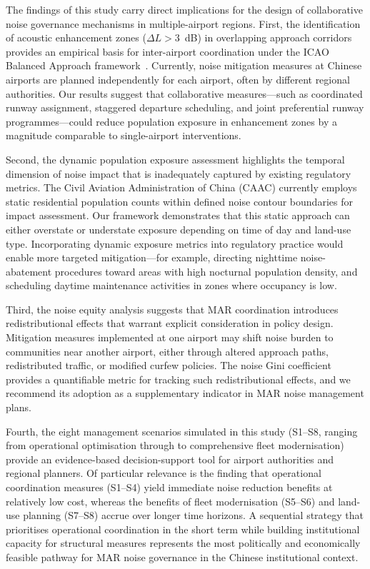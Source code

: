 \documentclass[review,12pt]{elsarticle}
\begin{document}
The findings of this study carry direct implications for the design of collaborative noise governance mechanisms in multiple-airport regions. First, the identification of acoustic enhancement zones ($\Delta L > 3$~dB) in overlapping approach corridors provides an empirical basis for inter-airport coordination under the ICAO Balanced Approach framework~\citep{icao2016balanced}. Currently, noise mitigation measures at Chinese airports are planned independently for each airport, often by different regional authorities. Our results suggest that collaborative measures---such as coordinated runway assignment, staggered departure scheduling, and joint preferential runway programmes---could reduce population exposure in enhancement zones by a magnitude comparable to single-airport interventions.

Second, the dynamic population exposure assessment highlights the temporal dimension of noise impact that is inadequately captured by existing regulatory metrics. The Civil Aviation Administration of China (CAAC) currently employs static residential population counts within defined noise contour boundaries for impact assessment. Our framework demonstrates that this static approach can either overstate or understate exposure depending on time of day and land-use type. Incorporating dynamic exposure metrics into regulatory practice would enable more targeted mitigation---for example, directing nighttime noise-abatement procedures toward areas with high nocturnal population density, and scheduling daytime maintenance activities in zones where occupancy is low.

Third, the noise equity analysis suggests that MAR coordination introduces redistributional effects that warrant explicit consideration in policy design. Mitigation measures implemented at one airport may shift noise burden to communities near another airport, either through altered approach paths, redistributed traffic, or modified curfew policies. The noise Gini coefficient provides a quantifiable metric for tracking such redistributional effects, and we recommend its adoption as a supplementary indicator in MAR noise management plans.

Fourth, the eight management scenarios simulated in this study (S1--S8, ranging from operational optimisation through to comprehensive fleet modernisation) provide an evidence-based decision-support tool for airport authorities and regional planners. Of particular relevance is the finding that operational coordination measures (S1--S4) yield immediate noise reduction benefits at relatively low cost, whereas the benefits of fleet modernisation (S5--S6) and land-use planning (S7--S8) accrue over longer time horizons. A sequential strategy that prioritises operational coordination in the short term while building institutional capacity for structural measures represents the most politically and economically feasible pathway for MAR noise governance in the Chinese institutional context.
\end{document}
